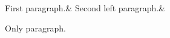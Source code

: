 \documentclass{memoir}
\begin{document}
\begin{pairs}
    \begin{Leftside}
        \beginnumbering
            \begin{astanza}
                First  paragraph.&
                Second left paragraph.\&
            \end{astanza}
        \endnumbering
    \end{Leftside}
    \begin{Rightside}
        \beginnumbering
        \autopar
        Only  paragraph.\pend
        \endnumbering
    \end{Rightside}

\end{pairs} 
\Columns
{}
\end{document}
